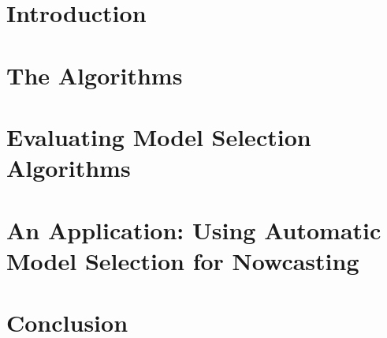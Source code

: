 \documentclass[a4paper]{report}
\begin{document}
\mbox{}
\thispagestyle{empty}
\newpage

\begin{singlespace}
\tableofcontents
\end{singlespace}



\chapter{Introduction}


\chapter{The Algorithms}


\chapter{Evaluating Model Selection Algorithms}


\chapter{An Application: Using Automatic Model Selection for Nowcasting}


\chapter{Conclusion}




\nocite{hendryjohansensantos}
\nocite{johansennielsen2009}
\nocite{ridgeregression70}
\nocite{spikeandslab}
\nocite{doornik2009}
\nocite{evalmodelsel}
\nocite{lassovauto}
\nocite{bstspaper}
\nocite{hendrykrolzig1999}
\nocite{hendrykrolzig2005}
\nocite{tibshirani}
\nocite{degreesoffreedomlasso}
\nocite{chechen}
\nocite{efronetal2004}
\nocite{zhangetal}
\nocite{kalmanfilter}
\nocite{introstatisticallearning}
\nocite{durbinkoopman2001}
\nocite{hendrydoornikbook}
\nocite{castleshephard2009}
\nocite{robertcasella2004}
\nocite{renfro2009}
\nocite{georgemcculloh}
\nocite{carterkohn2004}
\nocite{EricDFHSH14MF}
\nocite{WUBRYN2013}
\nocite{WEBB2009}
\nocite{CDHPSIS15}
\nocite{zouhastie}
\nocite{WhitePaper}



\renewcommand*{\bibname}{Literaturliste}
\end{document}
